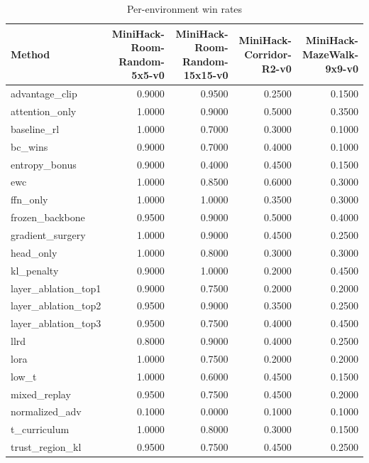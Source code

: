 \begin{table}[htbp]
\centering
\caption{Per-environment win rates}
\label{tab:per-env}
\begin{tabular}{lrrrr}
\toprule
\textbf{Method} & \textbf{MiniHack-Room-Random-5x5-v0} & \textbf{MiniHack-Room-Random-15x15-v0} & \textbf{MiniHack-Corridor-R2-v0} & \textbf{MiniHack-MazeWalk-9x9-v0} \\
\midrule
advantage\_clip & 0.9000 & 0.9500 & 0.2500 & 0.1500 \\
attention\_only & 1.0000 & 0.9000 & 0.5000 & 0.3500 \\
baseline\_rl & 1.0000 & 0.7000 & 0.3000 & 0.1000 \\
bc\_wins & 0.9000 & 0.7000 & 0.4000 & 0.1000 \\
entropy\_bonus & 0.9000 & 0.4000 & 0.4500 & 0.1500 \\
ewc & 1.0000 & 0.8500 & 0.6000 & 0.3000 \\
ffn\_only & 1.0000 & 1.0000 & 0.3500 & 0.3000 \\
frozen\_backbone & 0.9500 & 0.9000 & 0.5000 & 0.4000 \\
gradient\_surgery & 1.0000 & 0.9000 & 0.4500 & 0.2500 \\
head\_only & 1.0000 & 0.8000 & 0.3000 & 0.3000 \\
kl\_penalty & 0.9000 & 1.0000 & 0.2000 & 0.4500 \\
layer\_ablation\_top1 & 0.9000 & 0.7500 & 0.2000 & 0.2000 \\
layer\_ablation\_top2 & 0.9500 & 0.9000 & 0.3500 & 0.2500 \\
layer\_ablation\_top3 & 0.9500 & 0.7500 & 0.4000 & 0.4500 \\
llrd & 0.8000 & 0.9000 & 0.4000 & 0.2500 \\
lora & 1.0000 & 0.7500 & 0.2000 & 0.2000 \\
low\_t & 1.0000 & 0.6000 & 0.4500 & 0.1500 \\
mixed\_replay & 0.9500 & 0.7500 & 0.4500 & 0.2000 \\
normalized\_adv & 0.1000 & 0.0000 & 0.1000 & 0.1000 \\
t\_curriculum & 1.0000 & 0.8000 & 0.3000 & 0.1500 \\
trust\_region\_kl & 0.9500 & 0.7500 & 0.4500 & 0.2500 \\
\bottomrule
\end{tabular}
\end{table}